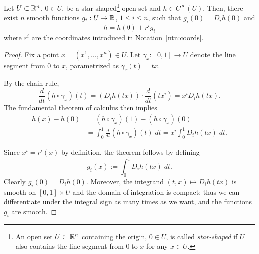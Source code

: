 \begin{lemma}\label{lem:Taylor}
	Let $U\subset\mathbb{R}^n$, $0\in U$, be a star-shaped\footnote{An open set $U\subset\mathbb{R}^n$ containing the origin, $0\in U$, is called \emph{star-shaped} if $U$ also contains the line segment from $0$ to $x$ for any $x\in U$.} open set and $h\in C^\infty(U)$.
	Then, there exist $n$ smooth functions $g_i: U \to \mathbb{R}$, $1\leq i \leq n$, such that $g_i(0) = D_i h(0)$ and
	\begin{equation}
		h = h(0) + r^i g_i
	\end{equation}
	where $r^i$ are the coordinates introduced in Notation~\ref{ntn:coords}.
\end{lemma}
\begin{proof}
	Fix a point $x = (x^1, \ldots, x^n) \in U$.
	Let $\gamma_x:[0,1]\to U$ denote the line segment from $0$ to $x$, parametrized as $\gamma_x(t) = tx$.

	By the chain rule,
	\begin{equation}
		\frac{d}{dt}(h \circ \gamma_x) (t) = \left(D_i h(t x)\right) \cdot \frac{d}{dt} (t x^i) = x^i D_i h(t x).
	\end{equation}
	The fundamental theorem of calculus then implies
	\begin{align}
		h(x) - h(0) & = (h \circ \gamma_x)(1) - (h \circ \gamma_x)(0)                                 \\
		            & = \int_0^1 \frac{d}{dt}(h \circ \gamma_x)(t)\;dt = x^i \int_0^1 D_i h(tx)\; dt.
	\end{align}

	Since $x^i = r^i(x)$ by definition, the theorem follows by defining
	\begin{equation}
		g_i(x) := \int_0^1 D_i h(tx)\; dt.
	\end{equation}
	Clearly $g_i(0) = D_i h(0)$.
	Moreover, the integrand $(t,x)\mapsto D_i h(tx)$ is smooth on $[0,1]\times U$ and the domain of integration is compact: thus we can differentiate under the integral sign as many times as we want, and the functions $g_i$ are smooth.
\end{proof}

